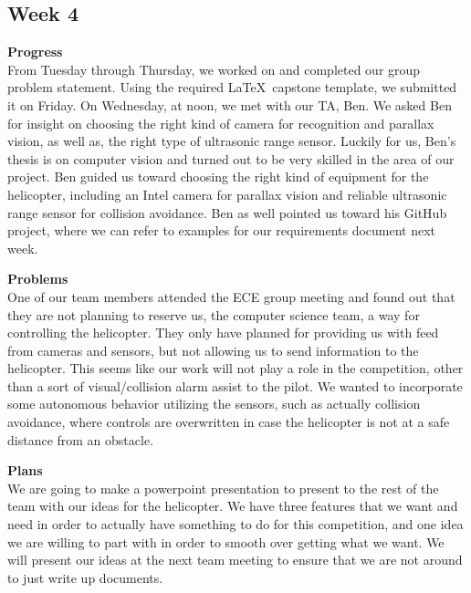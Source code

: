 \documentclass[onecolumn, oneside, letterpaper, draftclsnofoot, 10pt, compsoc]{IEEEtran}
\begin{document}
\subsection{Week 4}
\noindent \textbf{Progress}\\
From Tuesday through Thursday, we worked on and completed our group problem statement. Using the required \LaTeX\ capstone template, we submitted it on Friday. On Wednesday, at noon, we met with our TA, Ben. We asked Ben for insight on choosing the right kind of camera for recognition and parallax vision, as well as, the right type of ultrasonic range sensor. Luckily for us, Ben's thesis is on computer vision and turned out to be very skilled in the area of our project. Ben guided us toward choosing the right kind of equipment for the helicopter, including an Intel camera for parallax vision and reliable ultrasonic range sensor for collision avoidance. Ben as well pointed us toward his GitHub project, where we can refer to examples for our requirements document next week.

\noindent \textbf{Problems}\\
One of our team members attended the ECE group meeting and found out that they are not planning to reserve us, the computer science team, a way for controlling the helicopter. They only have planned for providing us with feed from cameras and sensors, but not allowing us to send information to the helicopter. This seems like our work will not play a role in the competition, other than a sort of visual/collision alarm assist to the pilot. We wanted to incorporate some autonomous behavior utilizing the sensors, such as actually collision avoidance, where controls are overwritten in case the helicopter is not at a safe distance from an obstacle.

\noindent \textbf{Plans}\\
We are going to make a powerpoint presentation to present to the rest of the team with our ideas for the helicopter. We have three features that we want and need in order to actually have something to do for this competition, and one idea we are willing to part with in order to smooth over getting what we want. We will present our ideas at the next team meeting to ensure that we are not around to just write up documents.
\end{document}
